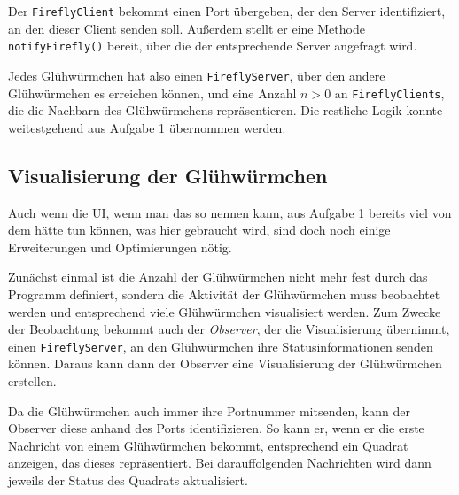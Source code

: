 \documentclass[12pt]{article}
\begin{document}
Der \texttt{FireflyClient} bekommt einen Port übergeben, der den Server identifiziert, an den dieser Client senden soll. Außerdem stellt er eine Methode \texttt{notifyFirefly()} bereit, über die der entsprechende Server angefragt wird.

Jedes Glühwürmchen hat also einen \texttt{FireflyServer}, über den andere Glühwürmchen es erreichen können, und eine Anzahl $n > 0$ an \texttt{FireflyClients}, die die Nachbarn des Glühwürmchens repräsentieren. Die restliche Logik konnte weitestgehend aus Aufgabe 1 übernommen werden.

\subsection*{Visualisierung der Glühwürmchen}
Auch wenn die UI, wenn man das so nennen kann, aus Aufgabe 1 bereits viel von dem hätte tun können, was hier gebraucht wird, sind doch noch einige Erweiterungen und Optimierungen nötig.

Zunächst einmal ist die Anzahl der Glühwürmchen nicht mehr fest durch das Programm definiert, sondern die Aktivität der Glühwürmchen muss beobachtet werden und entsprechend viele Glühwürmchen visualisiert werden. Zum Zwecke der Beobachtung bekommt auch der \emph{Observer}, der die Visualisierung übernimmt, einen \texttt{FireflyServer}, an den Glühwürmchen ihre Statusinformationen senden können. Daraus kann dann der Observer eine Visualisierung der Glühwürmchen erstellen.

Da die Glühwürmchen auch immer ihre Portnummer mitsenden, kann der Observer diese anhand des Ports identifizieren. So kann er, wenn er die erste Nachricht von einem Glühwürmchen bekommt, entsprechend ein Quadrat anzeigen, das dieses repräsentiert. Bei darauffolgenden Nachrichten wird dann jeweils der Status des Quadrats aktualisiert.
\end{document}
